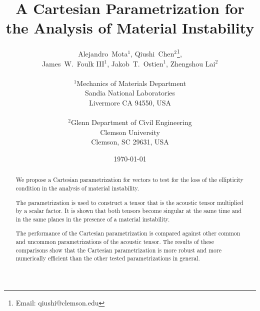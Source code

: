 \documentclass[12pt]{article}
\numberwithin{equation}{section}
\begin{document}





\title{A Cartesian Parametrization for the Analysis of Material
  Instability}

\author{
  \Large Alejandro~Mota$^1$,
  Qiushi~Chen$^2$\thanks{Email: qiushi@clemson.edu},
  \\
  \Large James~W.~Foulk {III}$^1$,
  Jakob~T.~Ostien$^1$, Zhengshou Lai$^2$
  \\
  \\
  $^1$Mechanics of Materials Department\\
  Sandia National Laboratories\\
  Livermore CA 94550, USA\\
  \\
  $^2$Glenn Department of Civil Engineering\\
  Clemson University\\
  Clemson, SC 29631, USA\\   
}

\date{\today}

\maketitle

\begin{abstract}
  We propose a Cartesian parametrization for vectors to test for the
  loss of the ellipticity condition in the analysis of material
  instability.

  The parametrization is used to construct a tensor that is the
  acoustic tensor multiplied by a scalar factor. It is shown that both
  tensors become singular at the same time and in the same planes in
  the presence of a material instability.

  The performance of the Cartesian parametrization is compared against
  other common and uncommon parametrizations of the acoustic
  tensor. The results of these comparisons show that the Cartesian
  parametrization is more robust and more numerically efficient than
  the other tested parametrizations in general.

\end{abstract}
\end{document}
